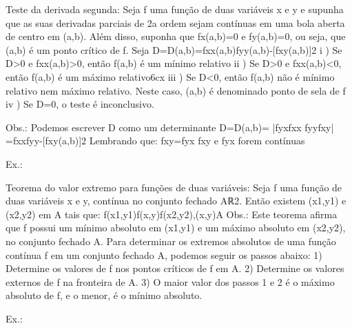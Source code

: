 {{{{{{Teste da derivada segunda:
    Seja f uma função de duas variáveis x e y e supunha que as suas derivadas parciais de 2a ordem sejam contínuas em uma bola aberta de centro em (a,b). Além disso, suponha que fx(a,b)=0 e fy(a,b)=0, ou seja, que (a,b) é um ponto crítico de f. Seja
        D=D(a,b)=fxx(a,b)fyy(a,b)-[fxy(a,b)]2
    i ) Se D>0 e fxx(a,b)>0, então f(a,b) é um mínimo relativo
    ii ) Se D>0 e fxx(a,b)<0, então f(a,b) é um máximo relativo6cx
    iii ) Se D<0, então f(a,b) não é mínimo relativo nem máximo relativo. Neste caso, (a,b) é denominado 
          ponto de sela de f 
    iv ) Se D=0, o teste é inconclusivo.

    Obs.: Podemos escrever D como um determinante
                D=D(a,b)= |fyxfxx   fyyfxy| =fxxfyy-[fxy(a,b)]2
    Lembrando que:
        fxy=fyx fxy e fyx forem contínuas

    Ex.: 








Teorema do valor extremo para funções de duas variáveis:
    Seja f uma função de duas variáveis x e y, contínua no conjunto fechado Aℝ2. Então existem (x1,y1) e (x2,y2) em A tais que:
        f(x1,y1)f(x,y)f(x2,y2),(x,y)A
    Obs.:
        Este teorema afirma que f possui um mínimo absoluto em (x1,y1) e um máximo absoluto em (x2,y2), no 
        conjunto fechado A.
    Para determinar os extremos absolutos de uma função contínua f em um conjunto fechado A, podemos seguir os passos abaixo:
        1) Determine os valores de f nos pontos críticos de f em A.
        2) Determine os valores externos de f na fronteira de A.
        3) O maior valor dos passos 1 e 2 é o máximo absoluto de f, e o menor, é o mínimo absoluto.

    Ex.: 






































}}}}}}
